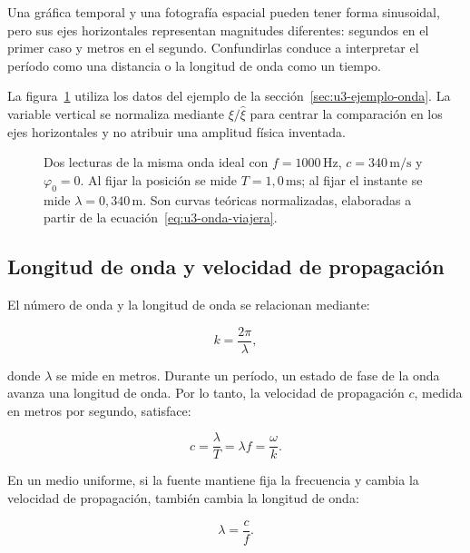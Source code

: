 Una gráfica temporal y una fotografía espacial pueden tener forma sinusoidal,
pero sus ejes horizontales representan magnitudes diferentes: segundos en el
primer caso y metros en el segundo. Confundirlas conduce a interpretar el
período como una distancia o la longitud de onda como un tiempo.

La figura~\ref{fig:u3-tiempo-espacio} utiliza los datos del ejemplo de la
sección~\ref{sec:u3-ejemplo-onda}. La variable vertical se normaliza mediante
\(\xi/\hat{\xi}\) para centrar la comparación en los ejes horizontales y no
atribuir una amplitud física inventada.

\begin{figure}[htbp]
    \centering
    
    \caption{Dos lecturas de la misma onda ideal con
    \(f=1000\,\text{Hz}\), \(c=340\,\text{m}/\text{s}\) y
    \(\varphi_0=0\). Al fijar la posición se mide
    \(T=1{,}0\,\text{ms}\); al fijar el instante se mide
    \(\lambda=0{,}340\,\text{m}\). Son curvas teóricas normalizadas,
    elaboradas a partir de la ecuación~\eqref{eq:u3-onda-viajera}.}
    \label{fig:u3-tiempo-espacio}
\end{figure}

\subsection{Longitud de onda y velocidad de propagación}
\label{sec:u3-longitud-velocidad}

El número de onda y la longitud de onda se relacionan mediante:

\begin{equation}
    k=\frac{2\pi}{\lambda},
    \label{eq:u3-numero-onda}
\end{equation}

donde \(\lambda\) se mide en metros. Durante un período, un estado de fase de
la onda avanza una longitud de onda. Por lo tanto, la velocidad de propagación
\(c\), medida en metros por segundo, satisface:

\begin{equation}
    c=\frac{\lambda}{T}=\lambda f=\frac{\omega}{k}.
    \label{eq:u3-velocidad-onda}
\end{equation}

En un medio uniforme, si la fuente mantiene fija la frecuencia y cambia la
velocidad de propagación, también cambia la longitud de onda:

\begin{equation}
    \lambda=\frac{c}{f}.
    \label{eq:u3-longitud-onda}
\end{equation}

